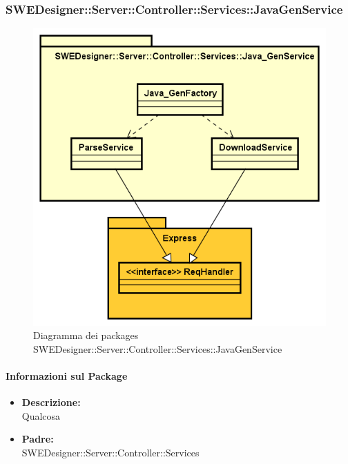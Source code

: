 		\subsubsection{SWEDesigner::Server::Controller::Services::JavaGenService}
		\begin{figure}[h!]
		\centering
		\includegraphics[scale=0.4]{Disegnetti/SWEDesigner__Server__Controller__Services__Java_GenService.png}
		\caption{Diagramma dei packages SWEDesigner::Server::Controller::Services::JavaGenService}
 		\end{figure}		
		\paragraph{Informazioni sul Package}
		\begin{itemize}				
			\item \textbf{Descrizione: }\\
			Qualcosa
			\item \textbf{Padre: }\\ SWEDesigner::Server::Controller::Services
			
		\end{itemize}
